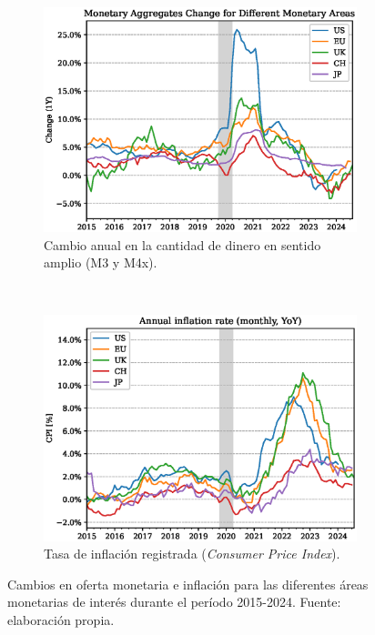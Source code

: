 \documentclass[titlepage, 12pt]{article}
\begin{document}
\begin{figure}
    \centering
    \begin{subfigure}[b]{0.49\textwidth}
        \includegraphics[width=\textwidth]{plots/money-supply.eps}
        \caption{Cambio anual en la cantidad de dinero en sentido amplio (M3 y M4x).}
    \end{subfigure}
    ~
    \begin{subfigure}[b]{0.49\textwidth}
        \includegraphics[width=\textwidth]{plots/inflation.eps}
        \caption{Tasa de inflación registrada (\textit{Consumer Price Index}).}
    \end{subfigure}
    \caption{Cambios en oferta monetaria e inflación para las diferentes áreas monetarias de interés durante el período 2015-2024. Fuente: elaboración propia.}
    \label{fig:m3-inflation}
\end{figure}
\end{document}
